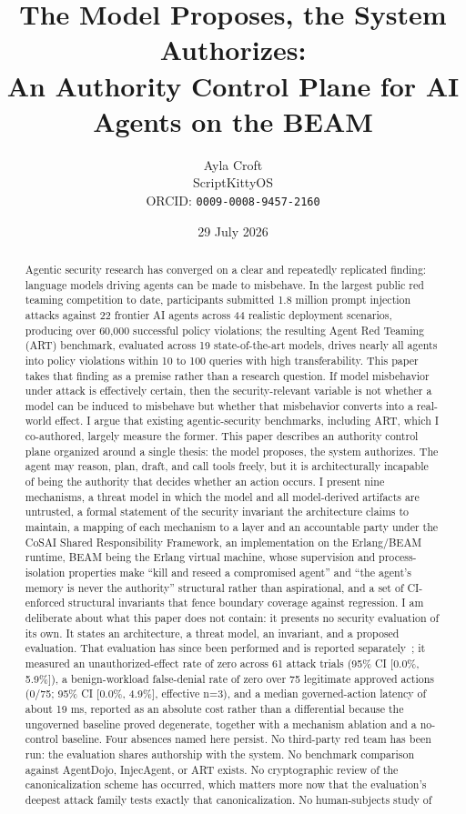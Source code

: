 \documentclass[11pt,letterpaper]{article}
\title{\vspace{-2.5em}\bfseries The Model Proposes, the System Authorizes:\\[0.25em]
An Authority Control Plane for AI Agents on the BEAM}
\author{
  Ayla Croft\\
  \normalsize ScriptKittyOS\\
  \normalsize ORCID: \texttt{0009-0008-9457-2160}
}
\date{\normalsize 29 July 2026}
\begin{document}
\maketitle

\begin{abstract}
\noindent
Agentic security research has converged on a clear and repeatedly replicated finding: language models driving agents can be made to misbehave. In the largest public red teaming competition to date, participants submitted 1.8 million prompt injection attacks against 22 frontier AI agents across 44 realistic deployment scenarios, producing over 60,000 successful policy violations; the resulting Agent Red Teaming (ART) benchmark, evaluated across 19 state-of-the-art models, drives nearly all agents into policy violations within 10 to 100 queries with high transferability. This paper takes that finding as a premise rather than a research question. If model misbehavior under attack is effectively certain, then the security-relevant variable is not whether a model can be induced to misbehave but whether that misbehavior converts into a real-world effect. I argue that existing agentic-security benchmarks, including ART, which I co-authored, largely measure the former. This paper describes an authority control plane organized around a single thesis: the model proposes, the system authorizes. The agent may reason, plan, draft, and call tools freely, but it is architecturally incapable of being the authority that decides whether an action occurs. I present nine mechanisms, a threat model in which the model and all model-derived artifacts are untrusted, a formal statement of the security invariant the architecture claims to maintain, a mapping of each mechanism to a layer and an accountable party under the CoSAI Shared Responsibility Framework, an implementation on the Erlang/BEAM runtime, BEAM being the Erlang virtual machine, whose supervision and process-isolation properties make ``kill and reseed a compromised agent'' and ``the agent's memory is never the authority'' structural rather than aspirational, and a set of CI-enforced structural invariants that fence boundary coverage against regression. I am deliberate about what this paper does not contain: it presents no security evaluation of its own. It states an architecture, a threat model, an invariant, and a proposed evaluation. That evaluation has since been performed and is reported separately~\cite{croft2026eval}; it measured an unauthorized-effect rate of zero across 61 attack trials (95\% CI {[}0.0\%, 5.9\%{]}), a benign-workload false-denial rate of zero over 75 legitimate approved actions (0/75; 95\% CI {[}0.0\%, 4.9\%{]}, effective n=3), and a median governed-action latency of about 19 ms, reported as an absolute cost rather than a differential because the ungoverned baseline proved degenerate, together with a mechanism ablation and a no-control baseline. Four absences named here persist. No third-party red team has been run: the evaluation shares authorship with the system. No benchmark comparison against AgentDojo, InjecAgent, or ART exists. No cryptographic review of the canonicalization scheme has occurred, which matters more now that the evaluation's deepest attack family tests exactly that canonicalization. No human-subjects study of 
\end{abstract}
\end{document}
